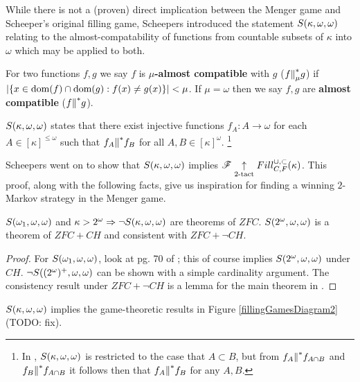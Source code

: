 While there is not a (proven) direct implication between the Menger game and
Scheeper's original filling game, Scheepers introduced the statement
$S(\kappa,\omega,\omega)$ relating to the almost-compatability of functions
from countable subsets of $\kappa$ into $\omega$ which may be applied to
both.

\begin{defn}
  For two functions $f,g$ we say $f$ is \textbf{$\mu$-almost compatible} with
  $g$ ($f{\parallel}^*_\mu g$) if $|\{x\in\textrm{dom}(f)\cap\textrm{dom}(g):f(x)\not=g(x)\}|<\mu$.
  If $\mu=\omega$ then we say $f,g$ are \textbf{almost compatible}
  ($f{\parallel}^* g$).
\end{defn}

\begin{defn}
  $S(\kappa,\omega,\omega)$ states that there exist injective functions
  $f_A:A\to\omega$ for each $A\in[\kappa]^{\leq\omega}$ such that
  $f_A{\parallel}^* f_B$ for all $A,B\in[\kappa]^\omega$.
  \footnote{
    In \cite{MR1129143}, $S(\kappa,\omega,\omega)$ is restricted to the case that
    $A\subset B$, but from $f_A{\parallel}^* f_{A\cap B}$ and
    $f_B{\parallel}^* f_{A\cap B}$ it follows then that $f_A{\parallel}^* f_B$ for any
    $A,B$.
  }
\end{defn}

Scheepers went on to show that $S(\kappa,\omega,\omega)$ implies
$\mathscr{F} \underset{2\text{-tact}}{\uparrow} Fill^{\cup,\subset}_{C,F}(\kappa)$. This proof, along with the following
facts, give us inspiration for
finding a winning $2$-Markov strategy in the Menger game.

\begin{thm}
  $S(\omega_1,\omega,\omega)$ and $\kappa>2^\omega\Rightarrow\neg S(\kappa,\omega,\omega)$
  are theorems of $ZFC$.
  $S(2^\omega,\omega,\omega)$ is a theorem of $ZFC+CH$ and consistent with
  $ZFC+\neg CH$.
\end{thm}

\begin{proof}
  For $S(\omega_1,\omega,\omega)$, look at pg. 70 of \cite{MR597342}; this of course
  implies $S(2^\omega,\omega,\omega)$ under $CH$.
  $\neg S((2^\omega)^+,\omega,\omega)$ can be shown with a simple cardinality argument.
  The consistency result under $ZFC+\neg CH$
  is a lemma for the main theorem in \cite{MR1129143}.
\end{proof}

\begin{thm}
  $S(\kappa,\omega,\omega)$ implies the game-theoretic results in
  Figure \ref{fillingGamesDiagram2} (TODO: fix).
\end{thm}

